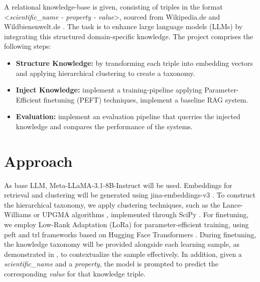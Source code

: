 \documentclass[11pt,a4paper, titlepage=false]{scrreprt}
\begin{document}

A relational knowledge-base is given, consisting of triples in the format \textless \textit{scientific\_name - property - value}\textgreater, sourced from Wikipedia.de \cite{wikipedia2024} and Wildbienenwelt.de \cite{wildbienenwelt2024}. The task is to enhance large language models (LLMs) by integrating this structured domain-specific knowledge. The project comprises the following steps:
\begin{itemize}
  \item \textbf{Structure Knowledge:} by transforming each triple into embedding vectors and applying hierarchical clustering to create a taxonomy.
  \item \textbf{Inject Knowledge:} implement a training-pipeline applying Parameter-Efficient finetuning (PEFT) techniques, implement a baseline RAG system.
  \item \textbf{Evaluation:} implement an evaluation pipeline that querries the injected knowledge and compares the performance of the systems.
\end{itemize}

\section*{Approach}

As base LLM, Meta-LLaMA-3.1-8B-Instruct \cite{dubey2024llama3herdmodels} will be used. Embeddings for retrieval and clustering will be generated using jina-embeddings-v3 \cite{sturua2024jinaembeddingsv3multilingualembeddingstask}. To construct the hierarchical taxonomy, we apply clustering techniques, such as the Lance-Williams \cite{lance1967general} or UPGMA algorithms \cite{sokal1958statistical}, implemented through SciPy \cite{2020SciPy-NMeth}. For finetuning, we employ Low-Rank Adaptation (LoRa) \cite{hu2021loralowrankadaptationlarge} for parameter-efficient training, using peft \cite{peft} and trl \cite{vonwerra2022trl} frameworks based on Hugging Face Transformers \cite{wolf-etal-2020-transformers}. During finetuning, the knowledge taxonomy will be provided alongside each learning sample, as demonstrated in \cite{liu2024educatingllmslikehuman}, to contextualize the sample effectively. In addition, given a \textit{scientific\_name} and a \textit{property}, the model is prompted to predict the corresponding \textit{value} for that knowledge triple.\\
\end{document}
